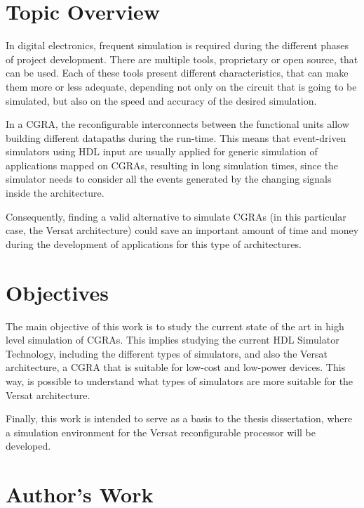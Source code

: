 \section{Topic Overview}
\label{section:overview}

In digital electronics, frequent simulation is required during the different
phases of project development. There are multiple tools, proprietary or open
source, that can be used. Each of these tools present different characteristics,
that can make them more or less adequate, depending not only on the circuit that
is going to be simulated, but also on the speed and accuracy of the desired
simulation.

In a CGRA, the reconfigurable interconnects between the functional units allow
building different datapaths during the run-time. This means that event-driven
simulators using HDL input are usually applied for generic simulation of
applications mapped on CGRAs, resulting in long simulation times, since the
simulator needs to consider all the events generated by the changing signals
inside the architecture.

Consequently, finding a valid alternative to simulate CGRAs (in this particular
case, the Versat architecture) could save an important amount of time and money
during the development of applications for this type of architectures.



\section{Objectives}
\label{section:objectives}

The main objective of this work is to study the current state of the art in high
level simulation of CGRAs. This implies studying the current HDL Simulator
Technology, including the different types of simulators, and also the Versat
architecture, a CGRA that is suitable for low-cost and low-power devices. This
way, is possible to understand what types of simulators are more suitable for
the Versat architecture.

Finally, this work is intended to serve as a basis to the thesis dissertation,
where a simulation environment for the Versat reconfigurable processor will be
developed.


\section{Author's Work}
\label{section:work}

